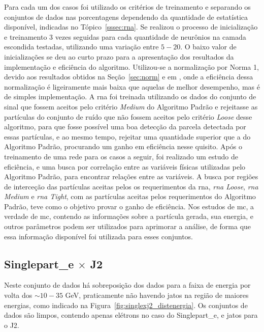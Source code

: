 Para cada um dos casos foi utilizado os critérios de treinamento e separando os 
conjuntos de dados nas porcentagens dependendo da quantidade de estatística
disponível, indicadas no Tópico~\ref{sssec:rna}. Se realizou o processo de
inicialização e treinamento 3 vezes seguidas para cada quantidade de neurônios na camada
escondida testadas, utilizando uma variação entre $5-20$. O baixo valor de
inicializações se deu ao curto prazo para a apresentação dos resultados da
implementação e eficiência do algoritmo. 
Utilizou-se a normalização por Norma 1,
devido aos resultados obtidos na Seção~\ref{sec:norm} e em \cite{tese_torres},
onde a eficiência dessa normalização é ligeiramente mais baixa que aquelas de
melhor desempenho, mas é de simples implementação. A \gls{rna} foi treinada utilizando os
dados do conjunto de sinal que fossem aceitos pelo critério \emph{Medium} do
Algoritmo Padrão e rejeitasse as partículas do conjunto de ruído que não fossem
aceitos pelo critério \emph{Loose} desse algoritmo, para que fosse possível uma
boa detecção da parcela detectada por essas partículas, e ao mesmo tempo,
rejeitar uma quantidade superior que a do Algoritmo Padrão, procurando um ganho em
eficiência nesse quisito. Após o treinamento de uma rede para os casos a seguir,
foi realizado um estudo de eficiência, e uma busca por correlação
entre as variáveis físicas utilizadas pelo Algoritmo Padrão, para encontrar relações entre as
variáveis. A busca por regiões de interceção das partículas aceitas pelos os
requerimentos da \gls{rna}, \emph{\gls{rna} Loose}, \emph{\gls{rna} Medium} e
\emph{\gls{rna} Tight}, com as partículas aceitas pelos requerimentos do
Algoritmo Padrão, teve como o objetivo provar o ganho de eficiência. Nos estudos
de \gls{mc}, a verdade de \gls{mc}, contendo as informações sobre a partícula
gerada, sua energia, e outros parâmetros podem ser utilizados para aprimorar a
análise, de forma que essa informação disponível foi utilizada para esses
conjuntos.


\FloatBarrier

\subsection{\texorpdfstring{Singlepart\_e $\times$ J2}{Singlepart\_e x J2}}
\label{ssec:single_e}

Neste conjunto de dados há sobreposição dos dados para a faixa de energia por
volta dos $\sim10-35$ GeV, praticamente não havendo jatos na região de maiores
energias, como indicado na Figura~\ref{fig:singlexj2_distenergia}. Os conjuntos de
dados são limpos, contendo apenas elétrons no caso do Singlepart\_e, e jatos
para o J2.

